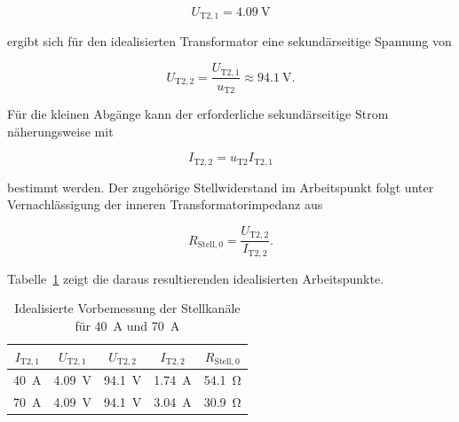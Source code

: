 \begin{equation}
    U_{\mathrm{T2},1}
    =
    \SI{4.09}{\volt}
    \label{eq:vorbemessung_arbeitsspannung}
\end{equation}

ergibt sich für den idealisierten Transformator eine sekundärseitige
Spannung von

\begin{equation}
    U_{\mathrm{T2},2}
    =
    \frac{U_{\mathrm{T2},1}}{u_{\mathrm{T2}}}
    \approx
    \SI{94.1}{\volt}.
    \label{eq:vorbemessung_sekundaerspannung}
\end{equation}

Für die kleinen Abgänge kann der erforderliche sekundärseitige Strom
näherungsweise mit

\begin{equation}
    I_{\mathrm{T2},2}
    =
    u_{\mathrm{T2}}
    I_{\mathrm{T2},1}
    \label{eq:vorbemessung_sekundaerstrom}
\end{equation}

bestimmt werden. Der zugehörige Stellwiderstand im Arbeitspunkt folgt
unter Vernachlässigung der inneren Transformatorimpedanz aus

\begin{equation}
    R_{\mathrm{Stell},0}
    =
    \frac{U_{\mathrm{T2},2}}
         {I_{\mathrm{T2},2}}.
    \label{eq:vorbemessung_stellwiderstand}
\end{equation}

Tabelle~\ref{tab:vorbemessung_kleine_stellkanaele} zeigt die daraus
resultierenden idealisierten Arbeitspunkte.

\begin{table}[H]
    \centering
    \caption{Idealisierte Vorbemessung der Stellkanäle für
    \SI{40}{\ampere} und \SI{70}{\ampere}}
    \label{tab:vorbemessung_kleine_stellkanaele}
    \begin{tabular}{ccccc}
        \toprule
        \(I_{\mathrm{T2},1}\) &
        \(U_{\mathrm{T2},1}\) &
        \(U_{\mathrm{T2},2}\) &
        \(I_{\mathrm{T2},2}\) &
        \(R_{\mathrm{Stell},0}\) \\
        \midrule
        \SI{40}{\ampere} &
        \SI{4.09}{\volt} &
        \SI{94.1}{\volt} &
        \SI{1.74}{\ampere} &
        \SI{54.1}{\ohm} \\

        \SI{70}{\ampere} &
        \SI{4.09}{\volt} &
        \SI{94.1}{\volt} &
        \SI{3.04}{\ampere} &
        \SI{30.9}{\ohm} \\
        \bottomrule
    \end{tabular}
\end{table}

